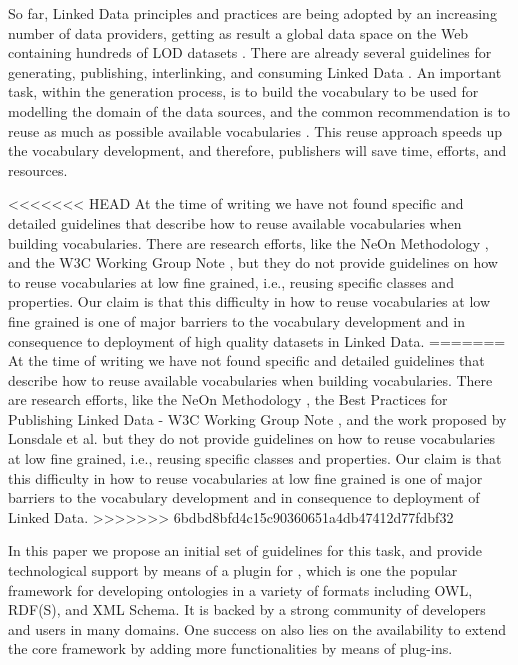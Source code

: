 So far, Linked Data principles and practices are being adopted by an increasing number of data providers, getting as result a global data space on the Web containing hundreds of LOD datasets \cite{Heath_Bizer_2011}. There are already several guidelines for generating, publishing, interlinking, and consuming Linked Data \cite{}. An important task, within the generation process, is to build the vocabulary to be used for modelling the domain of the data sources, and the common recommendation is to reuse as much as possible available vocabularies \cite{Heath_Bizer_2011,hyland14}. This reuse approach speeds up the vocabulary development, and therefore, publishers will save time, efforts, and resources. 

<<<<<<< HEAD
At the time of writing we have not found specific and detailed guidelines that describe how to reuse available vocabularies when building vocabularies. There are research efforts, like the NeOn Methodology \cite{}, and the W3C Working Group Note \cite{}, but they do not provide guidelines on how to reuse vocabularies at low fine grained, i.e., reusing specific classes and properties. Our claim is that this difficulty in how to reuse vocabularies at low fine grained is one of major barriers to the vocabulary development and in consequence to deployment of high quality datasets in Linked Data.
=======
At the time of writing we have not found specific and detailed guidelines that describe how to reuse available vocabularies when building vocabularies. There are research efforts, like the NeOn Methodology \cite{suarezfigueroa2012ontology}, the Best Practices for Publishing Linked Data - W3C Working Group Note \cite{hyland14}, and the work proposed by Lonsdale et al. \cite{Lonsdale2010318} but they do not provide guidelines on how to reuse vocabularies at low fine grained, i.e., reusing specific classes and properties. Our claim is that this difficulty in how to reuse vocabularies at low fine grained is one of major barriers to the vocabulary development and in consequence to deployment of Linked Data.
>>>>>>> 6bdbd8bfd4c15c90360651a4db47412d77fdbf32

In this paper we propose an initial set of guidelines for this task, and provide technological support by means of a plugin for \protege, which is one the popular framework for developing ontologies in a variety of formats including OWL, RDF(S), and XML Schema. It is backed by a strong community of developers and users in many domains. One success on \protege also lies on the availability to extend the core framework by adding more functionalities by means of plug-ins.

